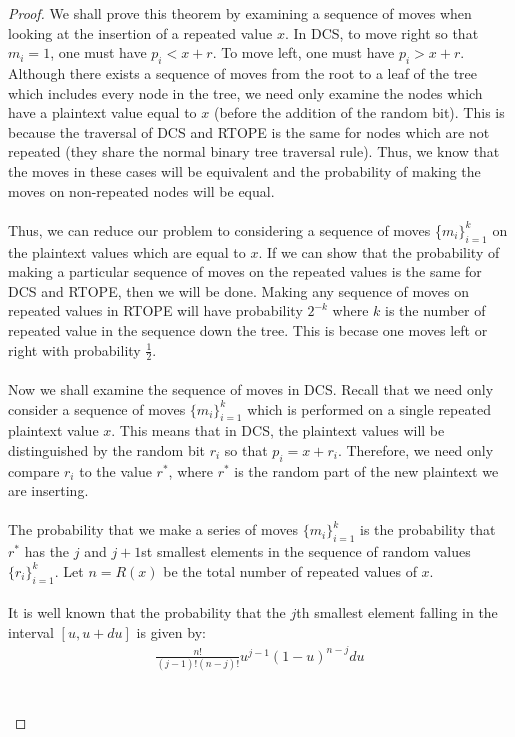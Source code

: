 \documentclass[12pt]{article}
\begin{document}
  \begin{proof}
We shall prove this theorem by examining a sequence of moves when looking at the insertion of a repeated value $x$. In DCS, to move right so that $m_i = 1$, one must have $p_i < x + r$. To move left, one must have $p_i > x + r$. Although there exists a sequence of moves from the root to a leaf of the tree which includes every node in the tree, we need only examine the nodes which have a plaintext value equal to $x$ (before the addition of the random bit). This is because the traversal of DCS and RTOPE is the same for nodes which are not repeated (they share the normal binary tree traversal rule). Thus, we know that the moves in these cases will be equivalent and the probability of making the moves on non-repeated nodes will be equal. \\ \\
Thus, we can reduce our problem to considering a sequence of moves \{$m_i\}_{i=1}^k$ on the plaintext values which are equal to $x$. If we can show that the probability of making a particular sequence of moves on the repeated values is the same for DCS and RTOPE, then we will be done. Making any sequence of moves on repeated values in RTOPE will have probability $2^{-k}$ where $k$ is the number of repeated value in the sequence down the tree. This is becase one moves left or right with probability $\frac{1}{2}$. \\ \\
Now we shall examine the sequence of moves in DCS. Recall that we need only consider a sequence of moves $\{m_i\}_{i=1}^k$ which is performed on a single repeated plaintext value $x$. This means that in DCS, the plaintext values will be distinguished by the random bit $r_i$ so that $p_i = x + r_i$. Therefore, we need only compare $r_i$ to the value $r^*$, where $r^*$ is the random part of the new plaintext we are inserting. \\ \\
The probability that we make a series of moves $\{m_i\}_{i=1}^k$ is the probability that $r^*$ has the $j$ and $j+1$st smallest elements in the sequence of random values $\{ r_i\}_{i=1}^k$. Let $n = R(x)$ be the total number of repeated values of $x$. \\ \\
It is well known that the probability that the $j$th smallest element falling in the interval $[u, u + du]$ is given by:
    \begin{eqnarray}
      \frac{n!}{(j-1)!(n-j)!} u^{j-1} (1-u)^{n-j} du
    \end{eqnarray} \\ \\

\end{proof}
\end{document}
